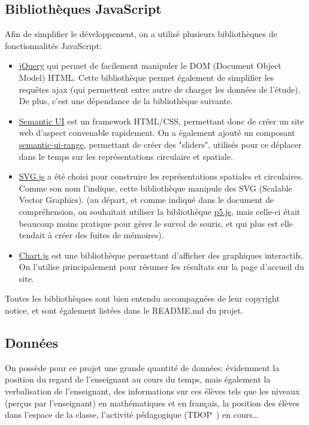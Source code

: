 \documentclass{article}
\begin{document}
\subsection{Bibliothèques JavaScript}
Afin de simplifier le développement, on a utilisé plusieurs bibliothèques de fonctionnalités JavaScript:
\begin{itemize}
    \item \href{https://jquery.com/}{jQuery} qui permet de facilement manipuler le DOM (Document Object Model) HTML. Cette bibliothèque permet également de simplifier les requêtes ajax (qui permettent entre autre de charger les données de l'étude). De plus, c'est une dépendance de la bibliothèque suivante.
    \item \href{https://semantic-ui.com/}{Semantic UI} est un framework HTML/CSS, permettant donc de créer un site web d'aspect convenable rapidement. On a également ajouté un composant \href{https://tyleryasaka.github.io/semantic-ui-range/}{semantic-ui-range}, permettant de créer des "sliders", utilisés pour ce déplacer dans le temps sur les représentations circulaire et spatiale.
    \item \href{http://svgjs.com/}{SVG.js} a été choisi pour construire les représentations spatiales et circulaires. Comme son nom l'indique, cette bibliothèque manipule des SVG (Scalable Vector Graphics). (au départ, et comme indiqué dans le document de compréhension, on souhaitait utiliser la bibliothèque \href{https://p5js.org/}{p5.js}, mais celle-ci était beaucoup moins pratique pour gérer le survol de souris, et qui plus est elle tendait à créer des fuites de mémoires).
    \item \href{http://www.chartjs.org/}{Chart.js} est une bibliothèque permettant d'afficher des graphiques interactifs. On l'utilise principalement pour résumer les résultats sur la page d'accueil du site.
\end{itemize}
Toutes les bibliothèques sont bien entendu accompagnées de leur copyright notice, et sont également listées dans le README.md du projet.

\subsection{Données}
On possède pour ce projet une grande quantité de données: évidemment la position du regard de l'enseignant au cours du temps, mais également la verbalisation de l'enseignant, des informations sur ces élèves tels que les niveaux (perçus par l'enseignant) en mathématiques et en français, la position des élèves dans l'espace de la classe, l'activité pédagogique (TDOP~\cite{TDOP}) en cours\ldots
\end{document}
